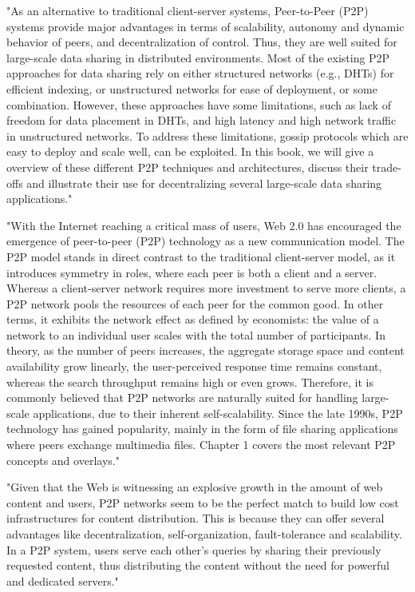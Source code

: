 "As an alternative to traditional client-server systems, Peer-to-Peer (P2P) systems provide major advantages in terms of scalability, autonomy and dynamic behavior of peers, and decentralization of control.
Thus, they are well suited for large-scale data sharing in distributed environments.
Most of the existing P2P approaches for data sharing rely on either structured networks (e.g., DHTs) for
efficient indexing, or unstructured networks for ease of deployment, or some combination.
However, these approaches have some limitations, such as lack of freedom for data placement in DHTs, and
high latency and high network traffic in unstructured networks.
To address these limitations, gossip protocols which are easy to deploy and scale well, can be exploited.
In this book, we will give a overview of these different P2P techniques and architectures, discuss their trade-offs and illustrate their use for decentralizing several large-scale data sharing applications."
\cite{book:p2p-mob}

"With the Internet reaching a critical mass of users, Web 2.0 has encouraged the emergence of peer-to-peer (P2P) technology as a new communication model.
The P2P model stands in direct contrast to the traditional client-server model, as it introduces symmetry in roles, where each peer is both a client and a server.
Whereas a client-server network requires more investment to serve more clients, a P2P network pools the resources of each peer for the common good. In other terms, it exhibits the network effect as defined by economists: the value of a network to an individual user scales with the total number of participants.
In theory, as the number of peers increases, the aggregate storage space and content availability grow linearly, the user-perceived response time remains constant, whereas the search throughput remains high or even grows.
Therefore, it is commonly believed that P2P networks are naturally suited for handling large-scale applications, due to their
inherent self-scalability.
Since the late 1990s, P2P technology has gained popularity, mainly in the form of file sharing applications where peers exchange multimedia files.
Chapter 1 covers the most relevant P2P concepts and overlays."\cite{book:p2p-mob}

"Given that the Web is witnessing an explosive growth in the amount of web content and users, P2P networks seem to be the perfect match to build low cost infrastructures for content distribution.
This is because they can offer several advantages like decentralization, self-organization, fault-tolerance and scalability.
In a P2P system, users serve each other’s queries by sharing their previously requested content, thus distributing the content without the need for powerful and dedicated servers."\cite{book:p2p-mob}

